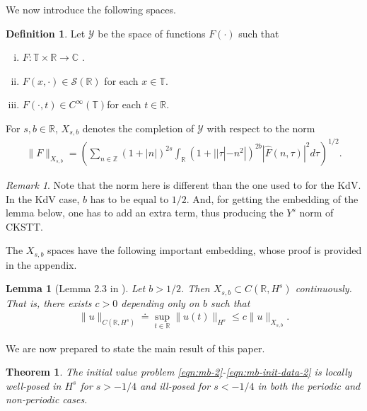 \documentclass[12pt,reqno]{amsart}
\numberwithin{equation}{section}  %
\numberwithin{figure}{section}
\newcommand{\rr}{\mathbb{R}}
\newcommand{\zz}{\mathbb{Z}}
\newcommand{\cc}{\mathbb{C}}
\newcommand{\ci}{\mathbb{T}}
\newcommand{\wh}{\widehat}
\theoremstyle{plain}
\newtheorem{theorem}{Theorem}
\newtheorem{lemma}{Lemma}
\theoremstyle{definition}
\newtheorem{definition}{Definition}
\theoremstyle{remark}
\newtheorem{remark}{Remark}
\begin{document}
We now introduce the following spaces. 
%
%
\begin{definition}
  Let $\mathcal{Y}$ be the space of functions $F(\cdot)$ such that
  \begin{enumerate}[(i)]
   \item{$F: \ci \times \rr \to \cc$ }.
   \item{ $F(x, \cdot) \in \mathcal{S}(\rr)$ for each $x \in \ci$}.
   \item{ $F(\cdot, t) \in C^{\infty}(\ci)$for each $t \in \rr$}.
  \end{enumerate}
  For $s, b \in \rr$, $X_{s,b}$ denotes the completion of $\mathcal{Y}$ with
  respect to the norm
  \begin{equation}
  \begin{split}
    \|F\|_{X_{s,b}} = \left( \sum_{n \in \zz} (1 + |n|)^{2s} \int_{\rr}
    (1 + | | \tau | - n^{2} |)^{2b} |\wh{F}(n, \tau)|^{2} d \tau\right)^{1/2}.
  \end{split}
  \label{eqn:bous-norm}
  \end{equation}
  \begin{framed}
    \begin{remark}
    Note that the norm here is different than the one used to for the KdV. In
    the KdV case, $b$ has to be equal to $1/2$. And, for getting the embedding
    of the lemma below, one has to add an extra term, thus producing the
    $Y^{s}$ norm of CKSTT.
    \label{rem:alternate-space}
    \end{remark}
  \end{framed}
\end{definition}
%
The $X_{s,b}$ spaces have the following important embedding, whose proof is
provided in the appendix.
%
%
%
%
%
%
%
%
\begin{lemma}[Lemma 2.3 in \cite{Farah:2009uq}]
  Let $b > 1/2$. Then $X_{s, b} \subset C(\rr, H^s)$ continuously. That is, there exists $c>0$ depending only on $b$ such that
%
%
\begin{equation*}
\begin{split}
  \| u \|_{C(\rr, H^s) } \doteq \sup_{t \in \rr} \| u(t) \|_{H^s } 
  \le c \| u \|_{X_{s,b}}.
\end{split}
\end{equation*}
%
\label{lem:embedding}
\end{lemma}
%
%
We are now prepared to state the main result of this paper.
%
%
%
%
%
%
%
%
%
%
\begin{theorem}
\label{thm:main}
The initial value problem 
\eqref{eqn:mb-2}-\eqref{eqn:mb-init-data-2} is locally well-posed in $H^s$ for
$s >
-1/4$ and ill-posed for $s < -1/4$ in both the periodic and non-periodic cases.
%
%
\end{theorem} 
%
%
%
%
%
%
%
%
%
%
\end{document}

